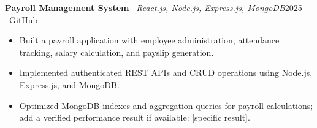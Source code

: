 \documentclass[10pt,letterpaper]{article}
\newcommand{\project}[3]{\textbf{#1} \textbar\ \textit{#2}\hfill #3\par}
\begin{document}
\project{Payroll Management System}{React.js, Node.js, Express.js, MongoDB}{2025 \textbar\ \href{https://github.com/Manikanta001}{GitHub}}
\begin{itemize}
    \item Built a payroll application with employee administration, attendance tracking, salary calculation, and payslip generation.
    \item Implemented authenticated REST APIs and CRUD operations using Node.js, Express.js, and MongoDB.
    \item Optimized MongoDB indexes and aggregation queries for payroll calculations; add a verified performance result if available: [specific result].
\end{itemize}
\end{document}
